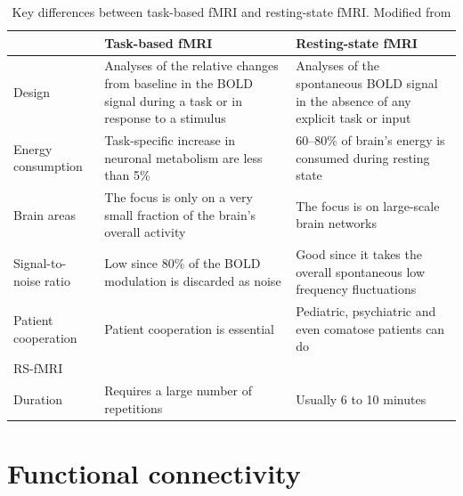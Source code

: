 \begin{table}[htb]
    \centering
    \caption[Key differences between task-based fMRI and resting-state fMRI]{Key differences between task-based fMRI and resting-state fMRI. Modified from \citet{smitha_resting_2017}}
    \label{tab:method:fMRI-paradigm}
    \begin{tabularx}{\textwidth}{XXX}
    \toprule
                          & Task-based fMRI                                                                                                 & Resting-state fMRI                                                                   \\ \midrule
    Design                & Analyses of the relative changes from baseline in the BOLD signal during a task or in response to a stimulus    & Analyses of the spontaneous BOLD signal in the absence of any explicit task or input \\
    Energy consumption    & Task-specific increase in neuronal metabolism are less than 5\%                                                 & 60–80\% of brain’s energy is consumed during resting state                           \\
    Brain areas           & The focus is only on a very small fraction of the brain’s overall activity                                      & The focus is on large-scale brain networks                                           \\
    Signal-to-noise ratio & Low since 80\% of the BOLD modulation is discarded as noise                                                     & Good since it takes the overall spontaneous low frequency fluctuations               \\
    Patient cooperation   & Patient cooperation is essential                                                                                & Pediatric, psychiatric and even comatose patients can do\\   RS-fMRI                 \\
    Duration              & Requires a large number of repetitions                                                                          & Usually 6 to 10 minutes                                                              \\ \bottomrule
    \end{tabularx}%
\end{table}

\section{Functional connectivity}
\label{sec:fmri:fc}

